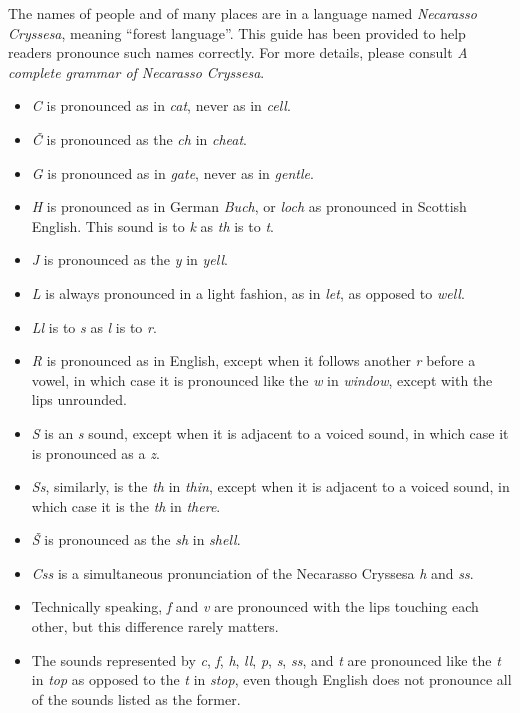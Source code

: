 \showchapters

\appendix
\showappendices


The names of people and of many places are in a language named \emph{Necarasso Cryssesa}, meaning ``forest language''. This guide has been provided to help readers pronounce such names correctly. For more details, please consult \emph{A complete grammar of Necarasso Cryssesa}.

\begin{itemize}
	\item \emph{C} is pronounced as in \emph{cat}, never as in \emph{cell}.
	\item \emph{\v{C}} is pronounced as the \emph{ch} in \emph{cheat}.
	\item \emph{G} is pronounced as in \emph{gate}, never as in \emph{gentle}.
	\item \emph{H} is pronounced as in German \emph{Buch}, or \emph{loch} as pronounced in Scottish English. This sound is to \emph{k} as \emph{th} is to \emph{t}.
	\item \emph{J} is pronounced as the \emph{y} in \emph{yell}.
	\item \emph{L} is always pronounced in a light fashion, as in \emph{let}, as opposed to \emph{well}.
	\item \emph{Ll} is to \emph{s} as \emph{l} is to \emph{r}.
	\item \emph{R} is pronounced as in English, except when it follows another \emph{r} before a vowel, in which case it is pronounced like the \emph{w} in \emph{window}, except with the lips unrounded.
	\item \emph{S} is an \emph{s} sound, except when it is adjacent to a voiced sound, in which case it is pronounced as a \emph{z}.
	\item \emph{Ss}, similarly, is the \emph{th} in \emph{thin}, except when it is adjacent to a voiced sound, in which case it is the \emph{th} in \emph{there}.
	\item \emph{\v{S}} is pronounced as the \emph{sh} in \emph{shell}.
	\item \emph{Css} is a simultaneous pronunciation of the Necarasso Cryssesa \emph{h} and \emph{ss}.
	\item Technically speaking, \emph{f} and \emph{v} are pronounced with the lips touching each other, but this difference rarely matters.
	\item The sounds represented by \emph{c}, \emph{f}, \emph{h}, \emph{ll}, \emph{p}, \emph{s}, \emph{ss}, and \emph{t} are pronounced like the \emph{t} in \emph{top} as opposed to the \emph{t} in \emph{stop}, even though English does not pronounce all of the sounds listed as the former.

\end{itemize}
